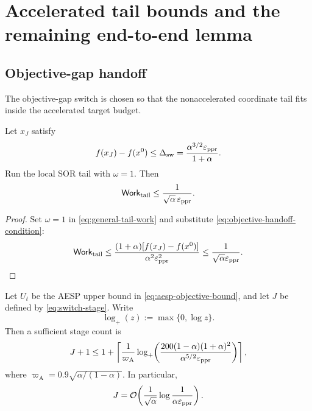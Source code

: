 \section{Accelerated tail bounds and the remaining end-to-end lemma}
\label{sec:accelerated-work}

\subsection{Objective-gap handoff}

The objective-gap switch is chosen so that the nonaccelerated coordinate tail
fits inside the accelerated target budget.

\begin{theorem}
\label{thm:objective-handoff-tail}
Let \(x_J\) satisfy
\begin{equation}
    f(x_J)-f(x^0)
    \leq
    \Delta_{\rm sw}
    =\frac{\alpha^{3/2}\varepsilon_{\mathrm{ppr}}}{1+\alpha}.
    \label{eq:objective-handoff-condition}
\end{equation}
Run the local SOR tail with \(\omega=1\).  Then
\begin{equation}
    \mathsf{Work}_{\rm tail}
    \leq\frac{1}{\sqrt\alpha\,\varepsilon_{\mathrm{ppr}}}.
    \label{eq:objective-handoff-work}
\end{equation}
\end{theorem}

\begin{proof}
Set \(\omega=1\) in \cref{eq:general-tail-work} and substitute
\cref{eq:objective-handoff-condition}:
\[
    \mathsf{Work}_{\rm tail}
    \leq
    \frac{(1+\alpha)[f(x_J)-f(x^0)]}
         {\alpha^2\varepsilon_{\mathrm{ppr}}^2}
    \leq
    \frac{1}{\sqrt\alpha\varepsilon_{\mathrm{ppr}}}.
\]
\end{proof}

\begin{proposition}
\label{prop:aesp-handoff-stage}
Let \(U_t\) be the AESP upper bound in
\cref{eq:aesp-objective-bound}, and let \(J\) be defined by
\cref{eq:switch-stage}.  Write
\begin{equation}
    \log_+(z):=\max\{0,\log z\}.
    \label{eq:log-plus}
\end{equation}
Then a sufficient stage count is
\begin{equation}
    J+1
    \leq
    1+
    \left\lceil
    \frac{1}{\varpi_{\mathrm A}}
    \log_+\!\left(
       \frac{200(1-\alpha)(1+\alpha)^2}
            {\alpha^{5/2}\varepsilon_{\mathrm{ppr}}}
    \right)
    \right\rceil,
    \label{eq:handoff-stage-count}
\end{equation}
where \(\varpi_{\mathrm A}=0.9\sqrt{\alpha/(1-\alpha)}\).  In particular,
\begin{equation}
    J=\mathcal O\!\left(
       \frac{1}{\sqrt\alpha}
       \log\frac{1}{\alpha\varepsilon_{\mathrm{ppr}}}
    \right).
    \label{eq:handoff-stage-asymptotic}
\end{equation}
\end{proposition}

